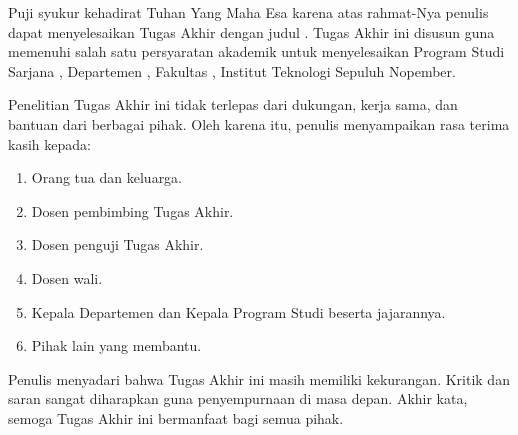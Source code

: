 Puji syukur kehadirat Tuhan Yang Maha Esa karena atas rahmat-Nya penulis dapat menyelesaikan Tugas Akhir dengan judul \textbf{\TheJudul}. Tugas Akhir ini disusun guna memenuhi salah satu persyaratan akademik untuk menyelesaikan Program Studi Sarjana \TheProdi, Departemen \TheDepartemen, Fakultas \TheFakultas, Institut Teknologi Sepuluh Nopember.

Penelitian Tugas Akhir ini tidak terlepas dari dukungan, kerja sama, dan bantuan dari berbagai pihak. Oleh karena itu, penulis menyampaikan rasa terima kasih kepada:
\begin{enumerate}
  \item Orang tua dan keluarga.
  \item Dosen pembimbing Tugas Akhir.
  \item Dosen penguji Tugas Akhir.
  \item Dosen wali.
  \item Kepala Departemen dan Kepala Program Studi beserta jajarannya.
  \item Pihak lain yang membantu.
\end{enumerate}

Penulis menyadari bahwa Tugas Akhir ini masih memiliki kekurangan. Kritik dan saran sangat diharapkan guna penyempurnaan di masa depan. Akhir kata, semoga Tugas Akhir ini bermanfaat bagi semua pihak.

